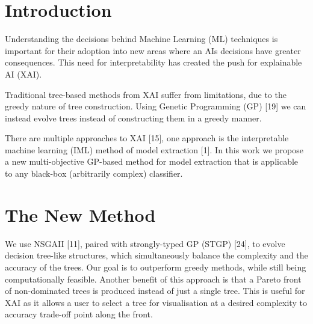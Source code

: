 \section{Introduction} 
Understanding the decisions behind Machine Learning (ML) techniques is important for their adoption into new areas where an AI\textquotesingle s decisions have greater consequences. This need for interpretability has created the push for explainable AI (XAI).


Traditional tree-based methods from XAI suffer from limitations, due to the greedy nature of tree construction. Using Genetic Programming (GP) [19] we can instead evolve trees instead of constructing them in a greedy manner.

There are multiple approaches to XAI [15], one approach is the interpretable machine learning (IML) method of model extraction [1]. In this work we propose a new multi-objective GP-based method for model extraction that is applicable to any black-box (arbitrarily complex) classifier.

\section{The New Method}
We use NSGAII [11], paired with strongly-typed GP (STGP) [24], to evolve decision tree-like structures, which simultaneously balance the complexity and the accuracy of the trees. Our goal is to outperform greedy methods, while still being computationally feasible. Another benefit of this approach is that a Pareto front of non-dominated trees is produced instead of just a single tree. This is useful for XAI as it allows a user to select a tree for visualisation at a desired complexity to accuracy trade-off point along the front.
